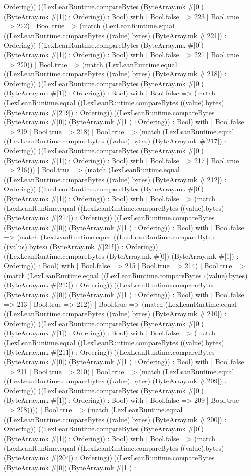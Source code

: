 \documentclass[11pt]{article}
\begin{document}
Ordering)) ((LexLeanRuntime.compareBytes (ByteArray.mk \#[0]) (ByteArray.mk \#[1]) : Ordering)) : Bool) with | Bool.false => 223 | Bool.true => 222) | Bool.true => (match (LexLeanRuntime.equal ((LexLeanRuntime.compareBytes ((value).bytes) (ByteArray.mk \#[221]) : Ordering)) ((LexLeanRuntime.compareBytes (ByteArray.mk \#[0]) (ByteArray.mk \#[1]) : Ordering)) : Bool) with | Bool.false => 221 | Bool.true => 220)) | Bool.true => (match (LexLeanRuntime.equal ((LexLeanRuntime.compareBytes ((value).bytes) (ByteArray.mk \#[218]) : Ordering)) ((LexLeanRuntime.compareBytes (ByteArray.mk \#[0]) (ByteArray.mk \#[1]) : Ordering)) : Bool) with | Bool.false => (match (LexLeanRuntime.equal ((LexLeanRuntime.compareBytes ((value).bytes) (ByteArray.mk \#[219]) : Ordering)) ((LexLeanRuntime.compareBytes (ByteArray.mk \#[0]) (ByteArray.mk \#[1]) : Ordering)) : Bool) with | Bool.false => 219 | Bool.true => 218) | Bool.true => (match (LexLeanRuntime.equal ((LexLeanRuntime.compareBytes ((value).bytes) (ByteArray.mk \#[217]) : Ordering)) ((LexLeanRuntime.compareBytes (ByteArray.mk \#[0]) (ByteArray.mk \#[1]) : Ordering)) : Bool) with | Bool.false => 217 | Bool.true => 216))) | Bool.true => (match (LexLeanRuntime.equal ((LexLeanRuntime.compareBytes ((value).bytes) (ByteArray.mk \#[212]) : Ordering)) ((LexLeanRuntime.compareBytes (ByteArray.mk \#[0]) (ByteArray.mk \#[1]) : Ordering)) : Bool) with | Bool.false => (match (LexLeanRuntime.equal ((LexLeanRuntime.compareBytes ((value).bytes) (ByteArray.mk \#[214]) : Ordering)) ((LexLeanRuntime.compareBytes (ByteArray.mk \#[0]) (ByteArray.mk \#[1]) : Ordering)) : Bool) with | Bool.false => (match (LexLeanRuntime.equal ((LexLeanRuntime.compareBytes ((value).bytes) (ByteArray.mk \#[215]) : Ordering)) ((LexLeanRuntime.compareBytes (ByteArray.mk \#[0]) (ByteArray.mk \#[1]) : Ordering)) : Bool) with | Bool.false => 215 | Bool.true => 214) | Bool.true => (match (LexLeanRuntime.equal ((LexLeanRuntime.compareBytes ((value).bytes) (ByteArray.mk \#[213]) : Ordering)) ((LexLeanRuntime.compareBytes (ByteArray.mk \#[0]) (ByteArray.mk \#[1]) : Ordering)) : Bool) with | Bool.false => 213 | Bool.true => 212)) | Bool.true => (match (LexLeanRuntime.equal ((LexLeanRuntime.compareBytes ((value).bytes) (ByteArray.mk \#[210]) : Ordering)) ((LexLeanRuntime.compareBytes (ByteArray.mk \#[0]) (ByteArray.mk \#[1]) : Ordering)) : Bool) with | Bool.false => (match (LexLeanRuntime.equal ((LexLeanRuntime.compareBytes ((value).bytes) (ByteArray.mk \#[211]) : Ordering)) ((LexLeanRuntime.compareBytes (ByteArray.mk \#[0]) (ByteArray.mk \#[1]) : Ordering)) : Bool) with | Bool.false => 211 | Bool.true => 210) | Bool.true => (match (LexLeanRuntime.equal ((LexLeanRuntime.compareBytes ((value).bytes) (ByteArray.mk \#[209]) : Ordering)) ((LexLeanRuntime.compareBytes (ByteArray.mk \#[0]) (ByteArray.mk \#[1]) : Ordering)) : Bool) with | Bool.false => 209 | Bool.true => 208)))) | Bool.true => (match (LexLeanRuntime.equal ((LexLeanRuntime.compareBytes ((value).bytes) (ByteArray.mk \#[200]) : Ordering)) ((LexLeanRuntime.compareBytes (ByteArray.mk \#[0]) (ByteArray.mk \#[1]) : Ordering)) : Bool) with | Bool.false => (match (LexLeanRuntime.equal ((LexLeanRuntime.compareBytes ((value).bytes) (ByteArray.mk \#[204]) : Ordering)) ((LexLeanRuntime.compareBytes (ByteArray.mk \#[0]) (ByteArray.mk \#[1]) : 
\end{document}
